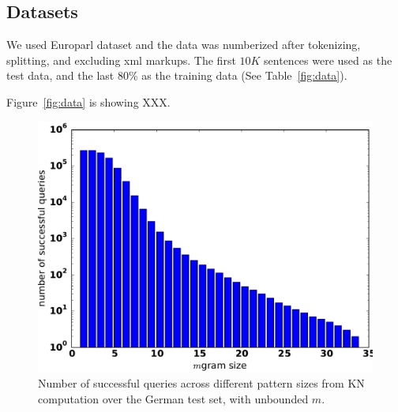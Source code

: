 
\subsection{Datasets}
We used Europarl dataset and the data was numberized after tokenizing, splitting, and excluding xml markups. The first $10K$ sentences were used as the test data, and the last 80\% as the training data (See Table~\ref{fig:data}).

\begin{table}
\caption{Tokens and sentence counts refer to the training partition. }\label{fig:data}
\end{table}
Figure~\ref{fig:data} is showing XXX.
\begin{figure}
\includegraphics[width=\columnwidth]{figures/german_pattern_size.pdf}
\caption{Number of successful queries across different pattern sizes from KN computation over the German test set, with unbounded $m$.}
\end{figure}\label{fig:germanpattern}

